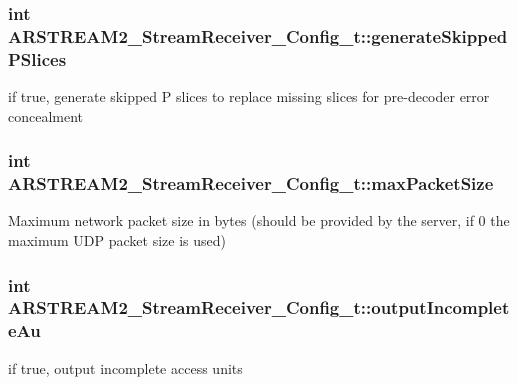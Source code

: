 \subsubsection[{\texorpdfstring{generate\+Skipped\+P\+Slices}{generateSkippedPSlices}}]{\setlength{\rightskip}{0pt plus 5cm}int A\+R\+S\+T\+R\+E\+A\+M2\+\_\+\+Stream\+Receiver\+\_\+\+Config\+\_\+t\+::generate\+Skipped\+P\+Slices}\hypertarget{struct_a_r_s_t_r_e_a_m2___stream_receiver___config__t_a5c755f04bd11970da40cccbc4dffa38d}{}\label{struct_a_r_s_t_r_e_a_m2___stream_receiver___config__t_a5c755f04bd11970da40cccbc4dffa38d}
if true, generate skipped P slices to replace missing slices for pre-\/decoder error concealment 
\subsubsection[{\texorpdfstring{max\+Packet\+Size}{maxPacketSize}}]{\setlength{\rightskip}{0pt plus 5cm}int A\+R\+S\+T\+R\+E\+A\+M2\+\_\+\+Stream\+Receiver\+\_\+\+Config\+\_\+t\+::max\+Packet\+Size}\hypertarget{struct_a_r_s_t_r_e_a_m2___stream_receiver___config__t_abd9569dd137f25c4ebc4afced32fda48}{}\label{struct_a_r_s_t_r_e_a_m2___stream_receiver___config__t_abd9569dd137f25c4ebc4afced32fda48}
Maximum network packet size in bytes (should be provided by the server, if 0 the maximum U\+DP packet size is used) 
\subsubsection[{\texorpdfstring{output\+Incomplete\+Au}{outputIncompleteAu}}]{\setlength{\rightskip}{0pt plus 5cm}int A\+R\+S\+T\+R\+E\+A\+M2\+\_\+\+Stream\+Receiver\+\_\+\+Config\+\_\+t\+::output\+Incomplete\+Au}\hypertarget{struct_a_r_s_t_r_e_a_m2___stream_receiver___config__t_a1a6a62577cca29b1c7464867b0125dff}{}\label{struct_a_r_s_t_r_e_a_m2___stream_receiver___config__t_a1a6a62577cca29b1c7464867b0125dff}
if true, output incomplete access units 
